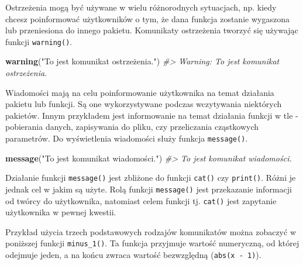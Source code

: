 \documentclass[paper=6in:9in,pagesize=pdftex,headinclude=on,footinclude=on,10pt]{scrbook}
\newenvironment{Shaded}{\begin{snugshade}}{\end{snugshade}}
\newcommand{\CommentTok}[1]{\textcolor[rgb]{0.56,0.35,0.01}{\textit{#1}}}
\newcommand{\KeywordTok}[1]{\textcolor[rgb]{0.13,0.29,0.53}{\textbf{#1}}}
\newcommand{\NormalTok}[1]{#1}
\newcommand{\StringTok}[1]{\textcolor[rgb]{0.31,0.60,0.02}{#1}}
\let\BeginKnitrBlock\begin \let\EndKnitrBlock\end
\begin{document}
Ostrzeżenia mogą być używane w wielu różnorodnych sytuacjach, np. kiedy chcesz poinformować użytkowników o tym, że dana funkcja zostanie wygaszona lub przeniesiona do innego pakietu.
Komunikaty ostrzeżenia tworzyć się używając funkcji \texttt{warning()}.

\begin{Shaded}
\begin{Highlighting}[]
\KeywordTok{warning}\NormalTok{(}\StringTok{"To jest komunikat ostrzeżenia."}\NormalTok{)}
\CommentTok{#> Warning: To jest komunikat ostrzeżenia.}
\end{Highlighting}
\end{Shaded}

Wiadomości mają na celu poinformowanie użytkownika na temat działania pakietu lub funkcji.
Są one wykorzystywane podczas wczytywania niektórych pakietów.
Innym przykładem jest informowanie na temat działania funkcji w tle - pobierania danych, zapisywania do pliku, czy przeliczania cząstkowych parametrów.
Do wyświetlenia wiadomości służy funkcja \texttt{message()}.

\begin{Shaded}
\begin{Highlighting}[]
\KeywordTok{message}\NormalTok{(}\StringTok{"To jest komunikat wiadomości."}\NormalTok{)}
\CommentTok{#> To jest komunikat wiadomości.}
\end{Highlighting}
\end{Shaded}

\BeginKnitrBlock{rmdinfo}
Działanie funkcji \texttt{message()} jest zbliżone do funkcji \texttt{cat()} czy \texttt{print()}.
Różni je jednak cel w jakim są użyte.
Rolą funkcji \texttt{message()} jest przekazanie informacji od twórcy do użytkownika, natomiast celem funkcji tj. \texttt{cat()} jest zapytanie użytkownika w pewnej kwestii.
\EndKnitrBlock{rmdinfo}

Przykład użycia trzech podstawowych rodzajów komunikatów można zobaczyć w poniższej funkcji \texttt{minus\_1()}.
Ta funkcja przyjmuje wartość numeryczną, od której odejmuje jeden, a na końcu zwraca wartość bezwzględną (\texttt{abs(x\ -\ 1)}).
\end{document}
